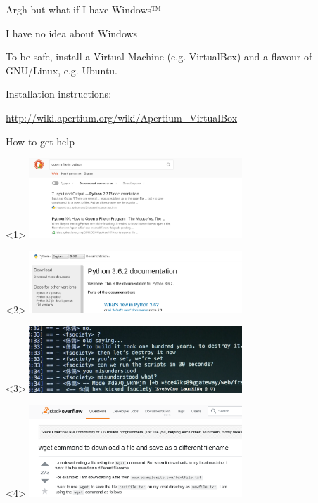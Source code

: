 \documentclass[10pt, compress]{beamer}
\begin{document}
\begin{frame}{Argh but what if I have Windows™}

\begin{center}
I have no idea about Windows
\end{center}

To be safe, install a Virtual Machine (e.g. VirtualBox) and a flavour
of GNU/Linux, e.g. Ubuntu.

Installation instructions:
\begin{center}
\url{http://wiki.apertium.org/wiki/Apertium_VirtualBox}
\end{center}

\end{frame}

\begin{frame}{How to get help}

\begin{center}
  \begin{onlyenv}<1>
  \includegraphics[width=0.6\textwidth]{graphics/duckduckopenfile.png}
  \end{onlyenv}
  \begin{onlyenv}<2>
  \includegraphics[width=0.6\textwidth]{graphics/pythondocs.png}
  \end{onlyenv}
  \begin{onlyenv}<3>
  \includegraphics[width=0.6\textwidth]{graphics/CKmO8DXVAAAWl1d.png}
  \end{onlyenv}
  \begin{onlyenv}<4>
  \includegraphics[width=0.6\textwidth]{graphics/stackoverflow.png}
  \end{onlyenv}
\end{center}


\end{frame}
\end{document}
